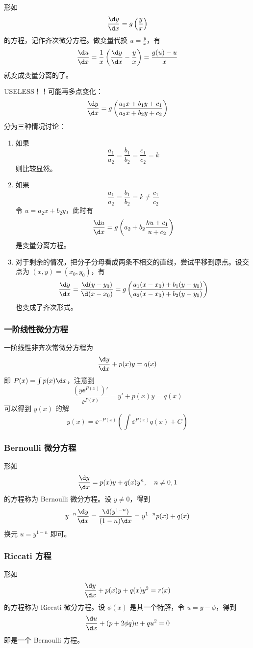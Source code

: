 形如
\[ \frac{\d y}{\d x} = g\left(\frac{y}{x}\right) \]
的方程，记作齐次微分方程。做变量代换 $u = \frac{y}{x}$，有
\[ \frac{\d u}{\d x} = \frac{1}{x} \left(\frac{\d y}{\d x} -\frac{y}{x} \right) = \frac{g(u) - u}{x} \]
就变成变量分离的了。

USELESS！！可能再多点变化：
\[ \frac{\d y}{\d x} = g \left(\frac{a_1 x + b_1 y + c_1}{a_2 x + b_2 y + c_2}\right) \]
分为三种情况讨论：
\begin{enumerate}
	\item 如果
	      \[ \frac{a_1}{a_2} = \frac{b_1}{b_2} = \frac{c_1}{c_2} = k \]
	      则比较显然。
	\item 如果
	      \[ \frac{a_1}{a_2} = \frac{b_1}{b_2} = k \neq \frac{c_1}{c_2} \]
	      令 $u = a_2 x + b_2 y$，此时有
	      \[ \frac{\d u}{\d x} = g \left(a_2 + b_2 \frac{k u + c_1}{u + c_2}\right) \]
	      是变量分离方程。
	\item 对于剩余的情况，把分子分母看成两条不相交的直线，尝试平移到原点。设交点为 $(x, y) = (x_0, y_0)$，有
	      \[ \frac{\d y}{\d x} = \frac{\d (y - y_0)}{\d (x - x_0)} = g \left(\frac{a_1 (x - x_0) + b_1 (y - y_0)}{a_2(x - x_0) + b_2 (y - y_0)} \right) \]
	      也变成了齐次形式。
\end{enumerate}

\subsubsection*{一阶线性微分方程}

一阶线性非齐次常微分方程为
\[ \frac{\d y}{\d x} + p(x) y = q(x) \]
即 $P(x) = \int p(x) \d x$，注意到
\[ \frac{\left(y\ee^{P(x)}\right)'}{\ee^{P(x)}} =  y' + p(x) y = q(x) \]
可以得到 $y(x)$ 的解
\[ y(x) = \ee^{-P(x)} \left( \int \ee^{P(x)} q(x) + C \right)  \]

\subsubsection*{Bernoulli 微分方程} 形如
\[ \frac{\d y}{\d x} = p(x) y + q(x) y^n, \quad n \neq 0,1 \]
的方程称为 Bernoulli 微分方程。设 $y \neq 0$，得到
\[ y^{-n} \frac{\d y}{\d x} = \frac{\d (y^{1-n})}{(1-n)\d x} = y^{1-n}p(x) + q(x) \]
换元 $u = y^{1-n}$ 即可。

\subsubsection*{Riccati 方程}
形如
\[ \frac{\d y}{\d x} + p(x) y + q(x)y^2 = r(x) \]
的方程称为 Riccati 微分方程。设 $\phi(x)$ 是其一个特解，令 $u = y - \phi$，得到
\[ \frac{\d u}{\d x} + (p + 2 \phi q) u + q u^2 = 0 \]
即是一个 Bernoulli 方程。

